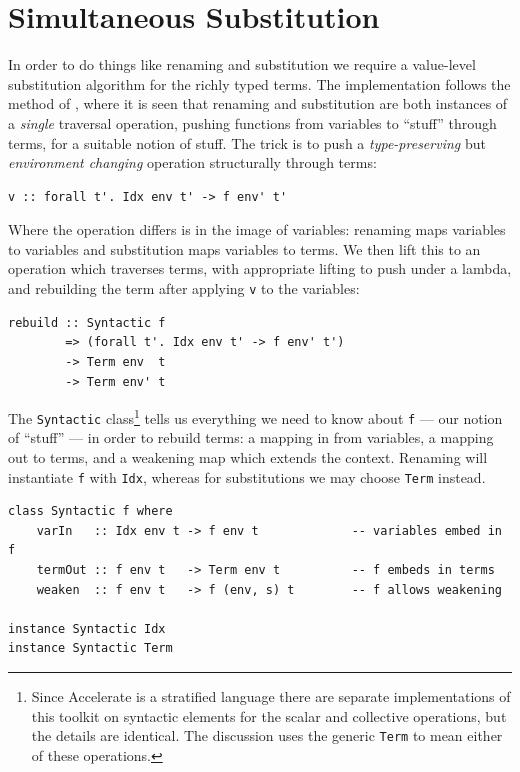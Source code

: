 \section{Simultaneous Substitution}
\label{sec:substitution}

In order to do things like renaming and substitution we require a value-level
substitution algorithm for the richly typed terms. The implementation follows
the method of \citet{McBride:2006up,McBride:2005jv}, where it is seen that
renaming and substitution are both instances of a \emph{single} traversal
operation, pushing functions from variables to ``stuff'' through terms, for a
suitable notion of stuff.
%
The trick is to push a \emph{type-preserving} but \emph{environment changing}
operation structurally through terms:
%
\begin{lstlisting}[style=haskell]
v :: forall t'. Idx env t' -> f env' t'
\end{lstlisting}

Where the operation differs is in the image of variables: renaming maps
variables to variables and substitution maps variables to terms. We then lift
this to an operation which traverses terms, with appropriate lifting to push
under a lambda, and rebuilding the term after applying \texttt{v} to the
variables:
%
\begin{lstlisting}[style=haskell]
rebuild :: Syntactic f
        => (forall t'. Idx env t' -> f env' t')
        -> Term env  t
        -> Term env' t
\end{lstlisting}

The \texttt{Syntactic} class\footnote{Since Accelerate is a stratified language
there are separate implementations of this toolkit on syntactic elements for the
scalar and collective operations, but the details are identical. The discussion
uses the generic \texttt{Term} to mean either of these operations.} tells us
everything we need to know about \texttt{f} --- our notion of ``stuff'' --- in
order to rebuild terms: a mapping in from variables, a mapping out to terms, and
a weakening map which extends the context. Renaming will instantiate \texttt{f}
with \texttt{Idx}, whereas for substitutions we may choose \texttt{Term}
instead.
%
\begin{lstlisting}[style=haskell]
class Syntactic f where
    varIn   :: Idx env t -> f env t             -- variables embed in f
    termOut :: f env t   -> Term env t          -- f embeds in terms
    weaken  :: f env t   -> f (env, s) t        -- f allows weakening

instance Syntactic Idx
instance Syntactic Term
\end{lstlisting}

